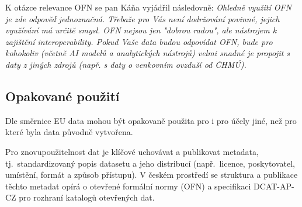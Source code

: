 K otázce relevance OFN se pan Káňa vyjádřil následovně: \textit{ Ohledně využití OFN je zde odpověď jednoznačná. Třebaže pro Vás není dodržování povinné, jejich využívání má určitě smysl. OFN nejsou jen "dobrou radou", ale nástrojem k zajištění interoperability. Pokud Vaše data budou odpovídat OFN, bude pro kohokoliv (včetně AI modelů a analytických nástrojů) velmi snadné je propojit s daty z jiných zdrojů (např. s daty o venkovním ovzduší od ČHMÚ).}

\FloatBarrier
\subsection{Opakované použití}
Dle směrnice EU data mohou být opakovaně použita pro i pro účely jiné, než pro které byla data původně vytvořena. \parencite[čl. 2 odst. 11]{SmerniceEvropskehoParlamentu2019}

Pro znovupoužitelnost dat je klíčové uchovávat a publikovat metadata, tj.~standardizovaný popis datasetu a jeho distribucí (např.~licence, poskytovatel, umístění, formát a způsob přístupu). V českém prostředí se struktura a publikace těchto metadat opírá o otevřené formální normy (OFN) a specifikaci DCAT-AP-CZ pro rozhraní katalogů otevřených dat. \parencite{OtevreneFormalniNormy,DCATAPCZRozhraniKatalogu}


